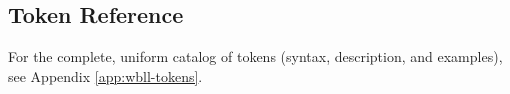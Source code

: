 \subsection{Token Reference}

For the complete, uniform catalog of tokens (syntax, description, and examples), see Appendix \ref{app:wbll-tokens}.

